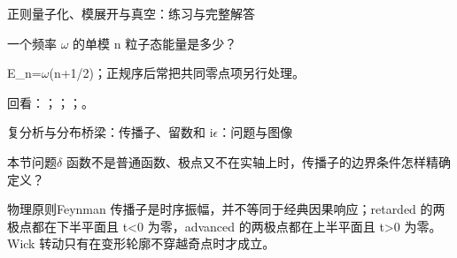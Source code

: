 \begin{frame}[t]{正则量子化、模展开与真空：练习与完整解答}
\footnotesize
\begin{block}{}一个频率 \ensuremath{\omega} 的单模 n 粒子态能量是多少？\end{block}
\begin{exampleblock}{}E\_n=\ensuremath{\omega}(n+1/\allowbreak{}2)；正规序后常把共同零点项另行处理。\end{exampleblock}
\vfill
\scriptsize 回看：；；；。
\end{frame}

\begin{frame}[t]{复分析与分布桥梁：传播子、留数和 i\ensuremath{\epsilon}：问题与图像}
\footnotesize
\begin{block}{本节问题}\ensuremath{\delta} 函数不是普通函数、极点又不在实轴上时，传播子的边界条件怎样精确定义？\end{block}
\begin{block}{物理原则}\quad Feynman 传播子是时序振幅，并不等同于经典因果响应；retarded 的两极点都在下半平面且 t<0 为零，advanced 的两极点都在上半平面且 t>0 为零。Wick 转动只有在变形轮廓不穿越奇点时才成立。\end{block}
\end{frame}

